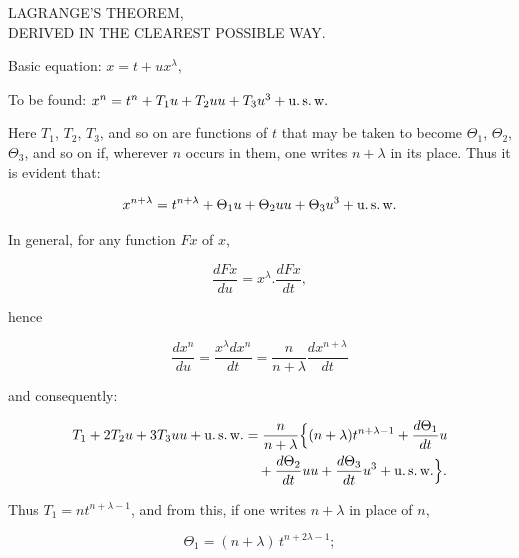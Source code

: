 \clearpage
{}%

\begin{center}
\large LAGRANGE'S THEOREM,\\ DERIVED IN THE CLEAREST POSSIBLE WAY.
\end{center}

\begin{center}\end{center}

\noindent Basic equation: \quad $x = t + u x^{\lambda},$

\noindent To be found: \quad $x^n = t^n + T_1 u + T_2 uu + T_3 u^3 + \text{u.\,s.\,w.}$

\noindent Here $T_1$, $T_2$, $T_3$, and so on are functions of $t$ that may be taken to become $\Theta_1$, $\Theta_2$, $\Theta_3$, and so on if, wherever $n$ occurs in them, one writes $n+\lambda$ in its place. Thus it is evident that:

\[ x^{n+\lambda} = t^{n+\lambda} + \Theta_1 u + \Theta_2 uu + \Theta_3 u^3 + \text{u.\,s.\,w.} \]

In general, for any function $Fx$ of $x$,

\[ \frac{dFx}{du} = x^{\lambda} \mathord{.} \frac{dFx}{dt}, \]

\noindent hence

\[ \frac{dx^n}{du} = \frac{x^{\lambda} dx^n}{dt} = \frac{n}{n+\lambda} \frac{dx^{n+\lambda}}{dt} \]

\noindent and consequently:

\[\begin{aligned}
T_1 + 2 T_2 u + 3 T_3 uu + \text{u.\,s.\,w.}
&= \frac{n}{n+\lambda}\Bigl\{(n+\lambda)t^{n+\lambda-1}+\frac{d\Theta_1}{dt}u\\
&\quad+\frac{d\Theta_2}{dt}uu+\frac{d\Theta_3}{dt}u^3+\text{u.\,s.\,w.}\Bigr\}.
\end{aligned}\]

\noindent Thus $T_1 = n t^{n+\lambda-1}$, and from this, if one writes $n+\lambda$ in place of $n$,

\[ \Theta_1 = (n+\lambda)\, t^{n+2\lambda-1}; \]
